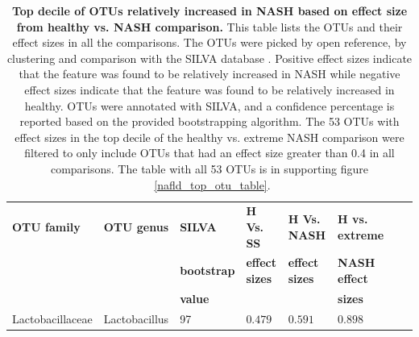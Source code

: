 \begin{table}[!ht]
\begin{tiny}
\begin{tabular}{|l|l|l|l|l|l|l|l|}
\hline
\bf{OTU family} & \bf{OTU genus} & \bf{SILVA} &\bf{H Vs. SS} & \bf{H Vs. NASH} & \bf{H vs. extreme} \\
& & \bf{bootstrap} & \bf{effect sizes} & \bf{effect sizes} & \bf{NASH effect} \\
& & \bf{value} & & & \bf{sizes}\\ \hline
Lactobacillaceae & Lactobacillus & 97 & $0.479$ & $0.591$ & $0.898$ \\ \hline
\end{tabular}
\end{tiny}
\caption[Top decile of OTUs consistently relatively increased in NASH based on effect size from healthy vs. NASH comparison.]{ \textbf{Top decile of OTUs relatively increased in NASH based on effect size from healthy vs. NASH comparison.} This table lists the OTUs and their effect sizes in all the comparisons. The OTUs were picked by open reference, by clustering and comparison with the SILVA database \cite{quast2013silva}. Positive effect sizes indicate that the feature was found to be relatively increased in NASH while negative effect sizes indicate that the feature was found to be relatively increased in healthy. OTUs were annotated with SILVA, and a confidence percentage is reported based on the provided bootstrapping algorithm. The 53 OTUs with effect sizes in the top decile of the healthy vs. extreme NASH comparison were filtered to only include OTUs that had an effect size greater than 0.4 in all comparisons. The table with all 53 OTUs is in supporting figure ~\ref{nafld_top_otu_table}.}
\label{nafld_top_consistent_otu_table}
\end{table}

